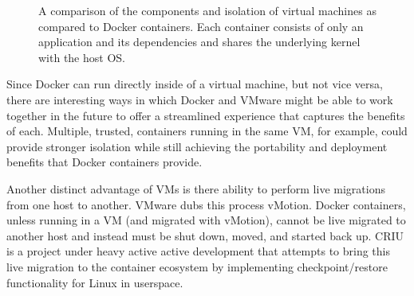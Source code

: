 \documentclass[\myfontsize, letterpaper]{article}
\begin{document}
\begin{figure}[h]
\centering
{}
\quad
\quad
{}
\caption{A comparison of the components and isolation of virtual machines as compared to Docker containers. Each container consists of only an application and its dependencies and shares the underlying kernel with the host OS.}
\label{fig:test}
\end{figure}

Since Docker can run directly inside of a virtual machine, but not vice versa, there are interesting ways in which Docker and VMware might be able to work together in the future to offer a streamlined experience that captures the benefits of each. Multiple, trusted, containers running in the same VM, for example, could provide stronger isolation while still achieving the portability and deployment benefits that Docker containers provide.

Another distinct advantage of VMs is there ability to perform live migrations from one host to another. VMware dubs this process vMotion\cite{vmotion}. Docker containers, unless running in a VM (and migrated with vMotion), cannot be live migrated to another host and instead must be shut down, moved, and started back up. CRIU\cite{CRIU} is a project under heavy active active development that attempts to bring this live migration to the container ecosystem by implementing checkpoint/restore functionality for Linux in userspace.
\end{document}
